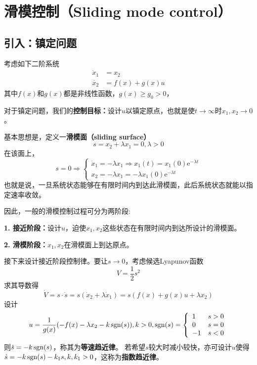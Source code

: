 \newpage
\section{滑模控制（Sliding mode control）}\label{5Cref}

\subsection{引入：镇定问题}

 考虑如下二阶系统
 \begin{equation}
   \begin{aligned}
    \dot{x}_1 & = x_2\\
       \dot{x_2} & = f (x) + g (x) u
    \end{aligned}\label{Sys:sliding_mode}
 \end{equation}
  其中$f (x)$和$g (x)$都是非线性函数，$g (x) \geq g_0 > 0$，
  
  对于镇定问题，我们的\textbf{控制目标：}设计$u$以镇定原点，也就是使$t
  \rightarrow \infty $时$ x_1, x_2 \rightarrow 0$。
  
  基本思想是，定义一\textbf{滑模面（sliding surface）}\[s = x_2 + \lambda x_1 = 0,
  \lambda > 0\]
  在该面上， \[ s = 0 \Rightarrow \left\{\begin{array}{l}
       \dot{x}_1 = - \lambda x_1 \Rightarrow x_1 (t) = x_1 (0) \mathrm{e}^{- \lambda t}\\
       x_2 = - \lambda x_1 = - \lambda x_1 (0) \mathrm{e}^{- \lambda  t}
     \end{array}\right. \]
     也就是说，一旦系统状态能够在有限时间内到达此滑模面，此后系统状态就能以指定速率收敛。
  
  因此，一般的滑模控制过程可分为两阶段:
  
  \textbf{1. 接近阶段：}设计$u$，迫使$x_1, x_2$这些状态在有限时间内到达所设计的滑模面。
  
  \textbf{2. 滑模阶段：}$x_1, x_2$在滑模面上到达原点。
  
  接下来设计接近阶段控制律。要让$s\to 0$，考虑候选Lyapunov函数\[V = \frac{1}{2} s^2\]
  求其导数得
  \[ \dot{V} = s \cdot \dot{s}=s(\dot{x}_2 + \lambda \dot{x}_1) = s (f (x) + g (x) u + \lambda x_2) \]
  设计\[u = \frac{1}{g (x)} (- f (x) - \lambda x_2 - k \operatorname{sgn} (s)),k > 0,\operatorname{sgn}(s) = \left\{\begin{array}{ll}
  1 & s > 0\\
  0 & s = 0\\
  - 1 & s < 0
\end{array}\right.\]
  则$\dot{s} = - k \operatorname{sgn} (s)$，称其为\textbf{等速趋近律}。
  若希望$s$较大时减小较快，亦可设计$u$使得$\dot{s}
  = - k \operatorname{sgn} (s) - k_1 s,k,k_1>0$，这称为\textbf{指数趋近律}。
  
